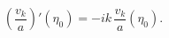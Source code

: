 \begin{equation}\label{eq:Danielsson}
\left(\frac{v_k}{a}\right)'(\eta_0)=-i k \,\frac{v_k}{a}(\eta_0).
\end{equation} 
